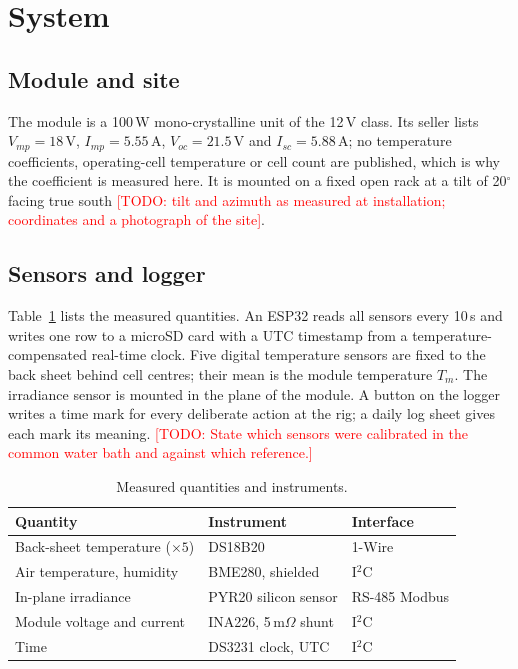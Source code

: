 \documentclass[conference]{IEEEtran}
\newcommand{\todo}[1]{\textcolor{red}{[TODO: #1]}}
\begin{document}
\section{System}
\subsection{Module and site}
The module is a 100\,W mono-crystalline unit of the 12\,V class. Its seller lists
$V_{mp}=18$\,V, $I_{mp}=5.55$\,A, $V_{oc}=21.5$\,V and $I_{sc}=5.88$\,A; no temperature
coefficients, operating-cell temperature or cell count are published, which is why the
coefficient is measured here. It is mounted on a fixed open rack at a tilt of
20$^\circ$ facing true south \todo{tilt and azimuth as measured at installation;
coordinates and a photograph of the site}.

\subsection{Sensors and logger}
Table~\ref{tab:instrument} lists the measured quantities. An ESP32 reads all sensors
every 10\,s and writes one row to a microSD card with a UTC timestamp from a
temperature-compensated real-time clock. Five digital temperature sensors are fixed to
the back sheet behind cell centres; their mean is the module temperature $T_m$. The
irradiance sensor is mounted in the plane of the module. A button on the logger writes a
time mark for every deliberate action at the rig; a daily log sheet gives each mark its
meaning. \todo{State which sensors were calibrated in the common water bath and against
which reference.}

\begin{table}[t]
\caption{Measured quantities and instruments.}
\label{tab:instrument}
\centering
\begin{tabular}{lll}
\toprule
Quantity & Instrument & Interface \\
\midrule
Back-sheet temperature ($\times5$) & DS18B20 & 1-Wire \\
Air temperature, humidity & BME280, shielded & I$^2$C \\
In-plane irradiance & PYR20 silicon sensor & RS-485 Modbus \\
Module voltage and current & INA226, 5\,m$\Omega$ shunt & I$^2$C \\
Time & DS3231 clock, UTC & I$^2$C \\
\bottomrule
\end{tabular}
\end{table}
\end{document}
